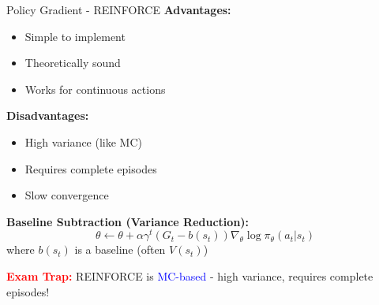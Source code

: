 \documentclass[8pt]{beamer}
\begin{document}
\begin{frame}{Policy Gradient - REINFORCE}
		\textbf{Advantages:}
		\begin{itemize}
			\item Simple to implement
			\item Theoretically sound
			\item Works for continuous actions
		\end{itemize}
		
		\textbf{Disadvantages:}
		\begin{itemize}
			\item High variance (like MC)
			\item Requires complete episodes
			\item Slow convergence
		\end{itemize}
		
		\textbf{Baseline Subtraction (Variance Reduction):}
		\[
		\theta \leftarrow \theta + \alpha \gamma^t (G_t - b(s_t)) \nabla_\theta \log \pi_\theta(a_t|s_t)
		\]
		where $b(s_t)$ is a baseline (often $V(s_t)$)
		
		\textcolor{red}{\textbf{Exam Trap:}} REINFORCE is \textcolor{blue}{MC-based} - high variance, requires complete episodes!
	\end{frame}
	
\end{document}
